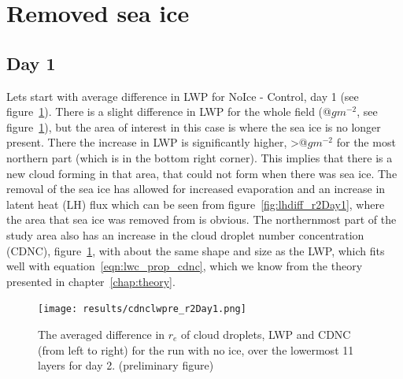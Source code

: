 \section{Removed sea ice}
\subsection{Day 1}
Lets start with average difference in LWP for NoIce - Control, day 1 (see figure~\ref{fig:relwpcdnc_r2Day1}). There is a slight difference in LWP for the whole field (@$gm^{-2}$, see figure~\ref{fig:relwpcdnc_r2Day1}), but the area of interest in this case is where the sea ice is no longer present. There the increase in LWP is significantly higher, >@$gm^{-2}$ for the most northern part (which is in the bottom right corner). This implies that there is a new cloud forming in that area, that could not form when there was sea ice. The removal of the sea ice has allowed for increased evaporation and an increase in latent heat (LH) flux which can be seen from figure~\ref{fig:lhdiff_r2Day1}, where the area that sea ice was removed from is obvious. The northernmost part of the study area also has an increase in the cloud droplet number concentration (CDNC), figure~\ref{fig:relwpcdnc_r2Day1}, with about the same shape and size as the LWP, which fits well with equation~\ref{eqn:lwc_prop_cdnc}, which we know from the theory presented in chapter~\ref{chap:theory}. 

\begin{figure}[h!]
\centering
\texttt{[image: results/cdnclwpre\_r2Day1.png]}
\caption{The averaged difference in $r_e$ of cloud droplets, LWP and CDNC (from left to right) for the run with no ice, over the lowermost 11 layers for day 2. (preliminary figure)}
\label{fig:relwpcdnc_r2Day1}
\end{figure}

